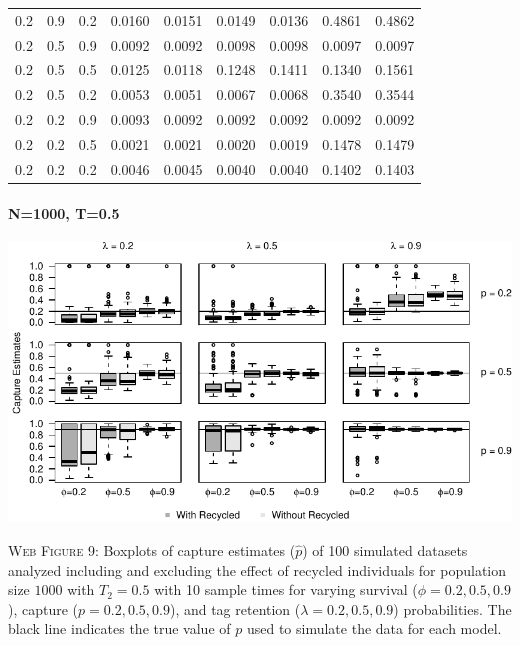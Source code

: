 \documentclass[]{article}
\let\oldparagraph\paragraph
\renewcommand{\paragraph}[1]{\oldparagraph{#1}\mbox{}}
\begin{document}
\begin{table}[ht]
{\begin{tabular}{rrrrrrrrr}
  0.2 & 0.9 & 0.2 & 0.0160 & 0.0151 & 0.0149 & 0.0136 & 0.4861 & 0.4862 \\ 
  0.2 & 0.5 & 0.9 & 0.0092 & 0.0092 & 0.0098 & 0.0098 & 0.0097 & 0.0097 \\ 
  0.2 & 0.5 & 0.5 & 0.0125 & 0.0118 & 0.1248 & 0.1411 & 0.1340 & 0.1561 \\ 
  0.2 & 0.5 & 0.2 & 0.0053 & 0.0051 & 0.0067 & 0.0068 & 0.3540 & 0.3544 \\ 
  0.2 & 0.2 & 0.9 & 0.0093 & 0.0092 & 0.0092 & 0.0092 & 0.0092 & 0.0092 \\ 
  0.2 & 0.2 & 0.5 & 0.0021 & 0.0021 & 0.0020 & 0.0019 & 0.1478 & 0.1479 \\ 
  0.2 & 0.2 & 0.2 & 0.0046 & 0.0045 & 0.0040 & 0.0040 & 0.1402 & 0.1403 \\ 
   \hline
\end{tabular}
}
\endgroup
\end{table}

\newpage

\paragraph{N=1000, T=0.5}\label{n1000-t0.5-1}

\includegraphics{Appendix_BW_files/figure-latex/figure9_capture_GJSTL4-1.pdf}

\textsc{Web Figure 9:} Boxplots of capture estimates (\(\hat{p}\)) of
100 simulated datasets analyzed including and excluding the effect of recycled
individuals for population size \(1000\) with \(T_2=0.5\) with 10 sample times for varying survival (\(\phi=0.2,0.5,0.9\)), capture
(\(p=0.2,0.5,0.9\)), and tag retention (\(\lambda=0.2,0.5,0.9\))
probabilities. The black line indicates the true value of \(p\) used to
simulate the data for each model.
\end{document}

